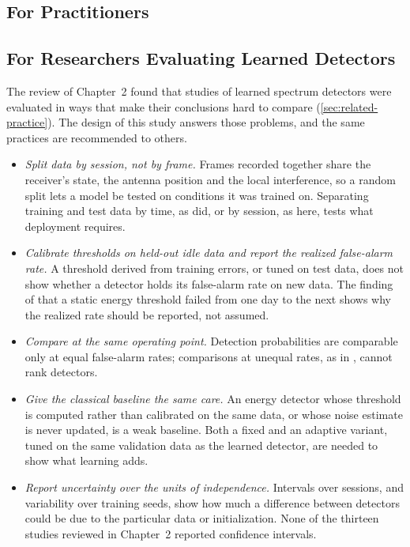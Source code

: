 \subsection{For Practitioners}
\label{sec:c-rec-practice}


\subsection{For Researchers Evaluating Learned Detectors}
\label{sec:c-rec-research}

The review of Chapter~2 found that studies of learned spectrum detectors were evaluated in ways that make their conclusions hard to compare (\cref{sec:related-practice}). The design of this study answers those problems, and the same practices are recommended to others.

\begin{itemize}
  \item \emph{Split data by session, not by frame.} Frames recorded together share the receiver's state, the antenna position and the local interference, so a random split lets a model be tested on conditions it was trained on. Separating training and test data by time, as \textcite{rajendran2020} did, or by session, as here, tests what deployment requires.
  \item \emph{Calibrate thresholds on held-out idle data and report the realized false-alarm rate.} A threshold derived from training errors, or tuned on test data, does not show whether a detector holds its false-alarm rate on new data. The finding of \textcite{baset2023} that a static energy threshold failed from one day to the next shows why the realized rate should be reported, not assumed.
  \item \emph{Compare at the same operating point.} Detection probabilities are comparable only at equal false-alarm rates; comparisons at unequal rates, as in \textcite{saber2021}, cannot rank detectors.
  \item \emph{Give the classical baseline the same care.} An energy detector whose threshold is computed rather than calibrated on the same data, or whose noise estimate is never updated, is a weak baseline. Both a fixed and an adaptive variant, tuned on the same validation data as the learned detector, are needed to show what learning adds.
  \item \emph{Report uncertainty over the units of independence.} Intervals over sessions, and variability over training seeds, show how much a difference between detectors could be due to the particular data or initialization. None of the thirteen studies reviewed in Chapter~2 reported confidence intervals.
\end{itemize}

